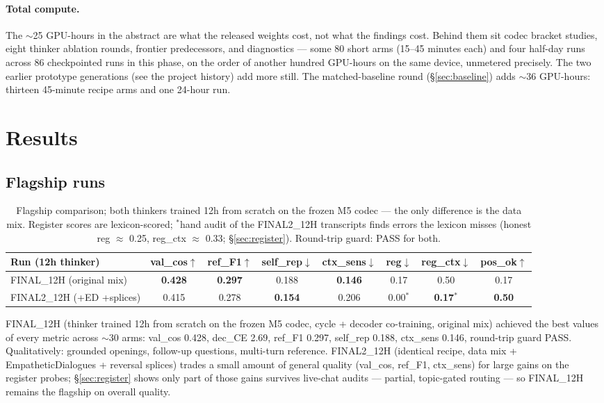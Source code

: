 \documentclass[11pt]{article}
\begin{document}
\paragraph{Total compute.} The $\sim$25 GPU-hours in the abstract are what
the released weights cost, not what the findings cost. Behind them sit
codec bracket studies, eight thinker ablation rounds, frontier predecessors,
and diagnostics --- some 80 short arms (15--45 minutes each) and four
half-day runs across 86 checkpointed runs in this phase, on the order of
another hundred GPU-hours on the same device, unmetered precisely. The two
earlier prototype generations (see the project history) add more still.
The matched-baseline round (\S\ref{sec:baseline}) adds $\sim$36 GPU-hours:
thirteen 45-minute recipe arms and one 24-hour run.

\section{Results}
\label{sec:results}

\subsection{Flagship runs}

\begin{table}[h]
\centering
\small
\begin{tabular}{lccccccc}
\toprule
Run (12h thinker) & val\_cos$\uparrow$ & ref\_F1$\uparrow$ & self\_rep$\downarrow$ & ctx\_sens$\downarrow$ & reg$\downarrow$ & reg\_ctx$\downarrow$ & pos\_ok$\uparrow$ \\
\midrule
FINAL\_12H (original mix) & \textbf{0.428} & \textbf{0.297} & 0.188 & \textbf{0.146} & 0.17 & 0.50 & 0.17 \\
FINAL2\_12H (+ED +splices) & 0.415 & 0.278 & \textbf{0.154} & 0.206 & 0.00$^{*}$ & \textbf{0.17}$^{*}$ & \textbf{0.50} \\
\bottomrule
\end{tabular}
\caption{Flagship comparison; both thinkers trained 12h from scratch on the
frozen M5 codec --- the only difference is the data mix. Register
scores are lexicon-scored; $^{*}$hand audit of the FINAL2\_12H transcripts
finds errors the lexicon misses (honest reg $\approx$ 0.25, reg\_ctx
$\approx$ 0.33; \S\ref{sec:register}). Round-trip guard: PASS for both.}
\label{tab:flagships}
\end{table}

FINAL\_12H (thinker trained 12h from scratch on the frozen M5 codec, cycle +
decoder co-training, original mix) achieved the best values of every metric
across $\sim$30 arms: val\_cos
0.428, dec\_CE 2.69, ref\_F1 0.297, self\_rep 0.188, ctx\_sens 0.146,
round-trip guard PASS. Qualitatively: grounded openings, follow-up questions,
multi-turn reference. FINAL2\_12H (identical recipe, data mix +
EmpatheticDialogues + reversal splices) trades a small amount of general
quality (val\_cos, ref\_F1, ctx\_sens) for large gains on the register
probes; \S\ref{sec:register} shows only part of those gains survives
live-chat audits --- partial, topic-gated routing --- so FINAL\_12H remains
the flagship on overall quality.
\end{document}
